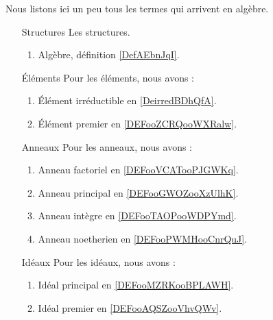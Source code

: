 
      \label{THEMEooVIQIooOcFAQS}

Nous listons ici un peu tous les termes qui arrivent en algèbre.

\begin{enumerate}
	\item[Structures]
	      Les structures.
	      \begin{enumerate}
		      \item
		            Algèbre, définition \ref{DefAEbnJqI}.
	      \end{enumerate}
	\item[Éléments]
	      Pour les éléments, nous avons :
	      \begin{enumerate}
		      \item
		            Élément irréductible en \ref{DeirredBDhQfA}.
		      \item
		            Élément premier en \ref{DEFooZCRQooWXRalw}.
	      \end{enumerate}
	\item[Anneaux]
	      Pour les anneaux, nous avons :
	      \begin{enumerate}
		      \item
		            Anneau factoriel en \ref{DEFooVCATooPJGWKq}.
		      \item
		            Anneau principal en \ref{DEFooGWOZooXzUlhK}.
		      \item
		            Anneau intègre en \ref{DEFooTAOPooWDPYmd}.
		      \item
		            Anneau noetherien en \ref{DEFooPWMHooCnrQuJ}.
	      \end{enumerate}
	\item[Idéaux]
	      Pour les idéaux, nous avons :
	      \begin{enumerate}
		      \item
		            Idéal principal en \ref{DEFooMZRKooBPLAWH}.
		      \item
		            Idéal premier en \ref{DEFooAQSZooVhvQWv}.
	      \end{enumerate}
\end{enumerate}

